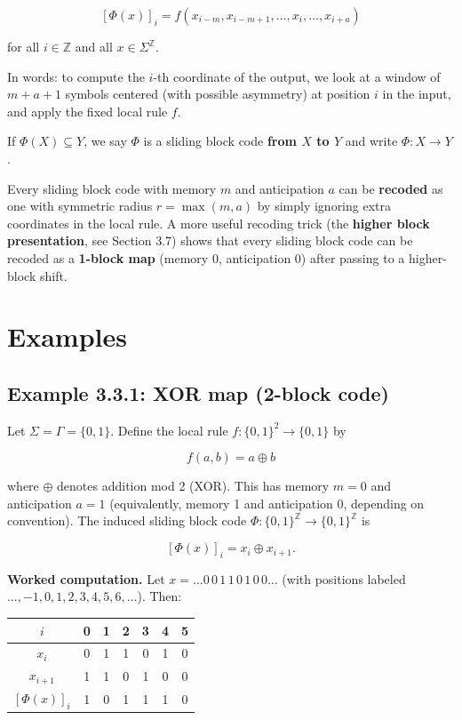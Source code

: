 \[[\Phi(x)]_i = f(x_{i-m}, x_{i-m+1}, \ldots, x_i, \ldots, x_{i+a})\]

for all $i \in \mathbb{Z}$ and all $x \in \Sigma^\mathbb{Z}$.

In words: to compute the $i$-th coordinate of the output, we look at a window of $m + a + 1$ symbols centered (with possible asymmetry) at position $i$ in the input, and apply the fixed local rule $f$.

If $\Phi(X) \subseteq Y$, we say $\Phi$ is a sliding block code \textbf{from $X$ to $Y$} and write $\Phi: X \to Y$.

\begin{remark}
Every sliding block code with memory $m$ and anticipation $a$ can be \textbf{recoded} as one with symmetric radius $r = \max(m, a)$ by simply ignoring extra coordinates in the local rule. A more useful recoding trick (the \textbf{higher block presentation}, see Section 3.7) shows that every sliding block code can be recoded as a \textbf{1-block map} (memory 0, anticipation 0) after passing to a higher-block shift.
\end{remark}



\section{Examples}

\subsection{Example 3.3.1: XOR map (2-block code)}

Let $\Sigma = \Gamma = \{ 0, 1\} $. Define the local rule $f: \{ 0,1\} ^2 \to \{ 0,1\} $ by

\[f(a, b) = a \oplus b\]

where $\oplus$ denotes addition mod 2 (XOR). This has memory $m = 0$ and anticipation $a = 1$ (equivalently, memory 1 and anticipation 0, depending on convention). The induced sliding block code $\Phi: \{ 0,1\} ^\mathbb{Z} \to \{ 0,1\} ^\mathbb{Z}$ is

\[[\Phi(x)]_i = x_i \oplus x_{i+1}.\]

\textbf{Worked computation.} Let $x = \ldots 0\, 0\, 1\, 1\, 0\, 1\, 0\, 0 \ldots$ (with positions labeled $\ldots, -1, 0, 1, 2, 3, 4, 5, 6, \ldots$). Then:

\begin{center}
\begin{tabular}{ccccccc}
\toprule
$i$ & 0 & 1 & 2 & 3 & 4 & 5 \\
\midrule
$x_i$ & 0 & 1 & 1 & 0 & 1 & 0 \\
$x_{i+1}$ & 1 & 1 & 0 & 1 & 0 & 0 \\
$[\Phi(x)]_i$ & 1 & 0 & 1 & 1 & 1 & 0 \\
\bottomrule
\end{tabular}
\end{center}

